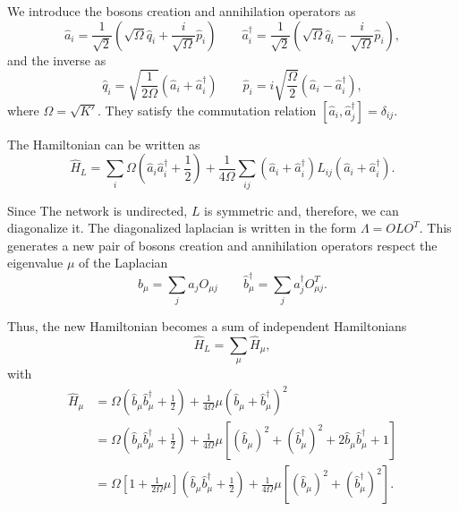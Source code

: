 We introduce the bosons creation and annihilation operators as
\begin{equation}
     \hat a_i = \frac{1}{\sqrt{2}}\left(\sqrt{\Omega} \hat q_i + \frac{i}{\sqrt{\Omega}}\hat p_i\right) \qquad 
     \hat a_i^\dagger = \frac{1}{\sqrt{2}}\left(\sqrt{\Omega} \hat q_i - \frac{i}{\sqrt{\Omega}}\hat p_i\right), 
\end{equation}
and the inverse as
\begin{equation}
    \hat q_i = \sqrt{\frac{1}{2\Omega}}\left(\hat a_i + \hat a_i^\dagger\right) \qquad
    \hat p_i = i\sqrt{\frac{\Omega}{2}}\left(\hat a_i - \hat a_i^\dagger\right),
\end{equation}
where $\Omega = \sqrt{K'}$.
They satisfy the commutation relation $\left[\hat a_i, \hat a^\dagger_j\right] = \delta_{ij}$. 

The Hamiltonian can be written as 
\begin{equation}
    \hat H_L = \sum_i \Omega \left(\hat a_i\hat a^\dagger_i + \frac{1}{2}\right) + \frac{1}{4\Omega}\sum_{ij}\left(\hat a_i +\hat a_i^\dagger\right)L_{ij}\left(\hat a_i +\hat a_i^\dagger\right).
\end{equation}

Since The network is undirected, $L$ is symmetric and, therefore, we can diagonalize it. The diagonalized laplacian is written in the form $\Lambda = OLO^T$.
This generates a new pair of bosons creation and annihilation operators respect the eigenvalue $\mu$ of the Laplacian
\begin{equation}
    b_\mu = \sum_j a_jO_{\mu j}  \qquad \hat b_\mu^\dagger = \sum_j a_j^\dagger O^T_{\mu j} .
\end{equation}

Thus, the new Hamiltonian becomes a sum of independent Hamiltonians
\begin{equation}
    \hat H_L = \sum_\mu \hat H_\mu,
\end{equation}
with
\begin{equation}
    \begin{split}
        \hat H_\mu &= \Omega \left(\hat b_\mu\hat b^\dagger_\mu + \frac{1}{2}\right) + \frac{1}{4\Omega}\mu\left(\hat b_\mu +\hat b_\mu^\dagger\right)^2\\
        &= \Omega \left(\hat b_\mu\hat b^\dagger_\mu + \frac{1}{2}\right) + \frac{1}{4\Omega}\mu\left[\left(\hat b_\mu\right)^2 +\left(\hat b_\mu^\dagger\right)^2 + 2 \hat b_\mu \hat b_\mu^\dagger + 1 \right]\\
        &= \Omega \left[ 1 + \frac{1}{2\Omega}\mu\right] \left(\hat b_\mu\hat b^\dagger_\mu + \frac{1}{2}\right) + \frac{1}{4\Omega}\mu\left[\left(\hat b_\mu\right)^2 +\left(\hat b_\mu^\dagger\right)^2 \right].
    \end{split}
\end{equation}

